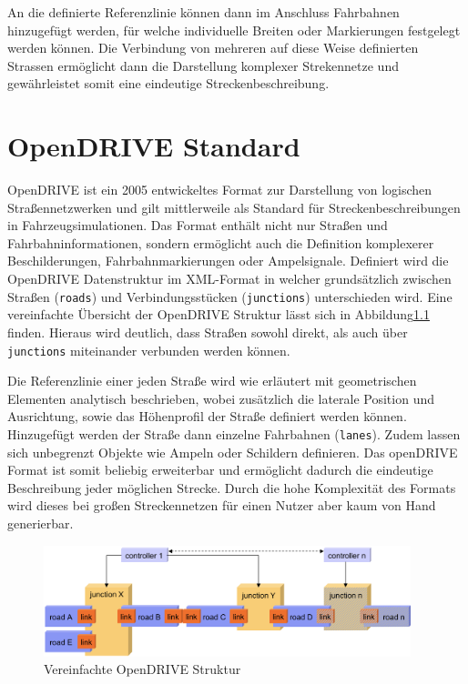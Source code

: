 An die definierte Referenzlinie können dann im Anschluss Fahrbahnen hinzugefügt werden, für welche individuelle Breiten oder Markierungen festgelegt werden können. Die Verbindung von mehreren auf diese Weise definierten Strassen ermöglicht dann die Darstellung komplexer Strekennetze und gewährleistet somit eine eindeutige Streckenbeschreibung.

\chapter{OpenDRIVE Standard}

OpenDRIVE ist ein 2005 entwickeltes Format zur Darstellung von logischen Straßennetzwerken und gilt mittlerweile als Standard für Streckenbeschreibungen in Fahrzeugsimulationen. Das Format enthält nicht nur Straßen und Fahrbahninformationen, sondern ermöglicht auch die Definition komplexerer Beschilderungen, Fahrbahnmarkierungen oder Ampelsignale. \cite{OpenDRIVE.2019} Definiert wird die OpenDRIVE Datenstruktur im XML-Format in welcher grundsätzlich zwischen Straßen (\texttt{roads}) und Verbindungsstücken (\texttt{junctions}) unterschieden wird. Eine vereinfachte Übersicht der OpenDRIVE Struktur lässt sich in Abbildung\ref{abb3} finden. Hieraus wird deutlich, dass Straßen sowohl direkt, als auch über \texttt{junctions} miteinander verbunden werden können. 

Die Referenzlinie einer jeden Straße wird wie erläutert mit geometrischen Elementen analytisch beschrieben, wobei zusätzlich die laterale Position und Ausrichtung, sowie das Höhenprofil der Straße definiert werden können. Hinzugefügt werden der Straße dann einzelne Fahrbahnen (\texttt{lanes}). Zudem lassen sich unbegrenzt Objekte wie Ampeln oder Schildern definieren. \cite{OpenDRIVEDoku.2019} Das openDRIVE Format ist somit beliebig erweiterbar und ermöglicht dadurch die eindeutige Beschreibung jeder möglichen Strecke. Durch die hohe Komplexität des Formats wird dieses bei großen Streckennetzen für einen Nutzer aber kaum von Hand generierbar.

\begin{figure}[H]
\flushleft
\includegraphics[width=0.95\textwidth]{fig/fig3.png}
\caption{Vereinfachte OpenDRIVE Struktur \cite{Dupuis.2006}}
\label{abb3}
\end{figure}

